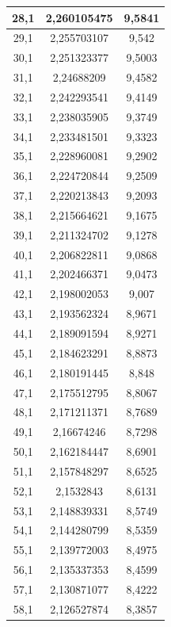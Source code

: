 \documentclass[a4paper,12pt]{article}
\begin{document}
\begin{longtable}{|c|c|c|}
        28,1 & 2,260105475 & 9,5841 \\ \hline
        29,1 & 2,255703107 & 9,542 \\ \hline
        30,1 & 2,251323377 & 9,5003 \\ \hline
        31,1 & 2,24688209 & 9,4582 \\ \hline
        32,1 & 2,242293541 & 9,4149 \\ \hline
        33,1 & 2,238035905 & 9,3749 \\ \hline
        34,1 & 2,233481501 & 9,3323 \\ \hline
        35,1 & 2,228960081 & 9,2902 \\ \hline
        36,1 & 2,224720844 & 9,2509 \\ \hline
        37,1 & 2,220213843 & 9,2093 \\ \hline
        38,1 & 2,215664621 & 9,1675 \\ \hline
        39,1 & 2,211324702 & 9,1278 \\ \hline
        40,1 & 2,206822811 & 9,0868 \\ \hline
        41,1 & 2,202466371 & 9,0473 \\ \hline
        42,1 & 2,198002053 & 9,007 \\ \hline
        43,1 & 2,193562324 & 8,9671 \\ \hline
        44,1 & 2,189091594 & 8,9271 \\ \hline
        45,1 & 2,184623291 & 8,8873 \\ \hline
        46,1 & 2,180191445 & 8,848 \\ \hline
        47,1 & 2,175512795 & 8,8067 \\ \hline
        48,1 & 2,171211371 & 8,7689 \\ \hline
        49,1 & 2,16674246 & 8,7298 \\ \hline
        50,1 & 2,162184447 & 8,6901 \\ \hline
        51,1 & 2,157848297 & 8,6525 \\ \hline
        52,1 & 2,1532843 & 8,6131 \\ \hline
        53,1 & 2,148839331 & 8,5749 \\ \hline
        54,1 & 2,144280799 & 8,5359 \\ \hline
        55,1 & 2,139772003 & 8,4975 \\ \hline
        56,1 & 2,135337353 & 8,4599 \\ \hline
        57,1 & 2,130871077 & 8,4222 \\ \hline
        58,1 & 2,126527874 & 8,3857 \\ \hline

\end{longtable}
\end{document}
